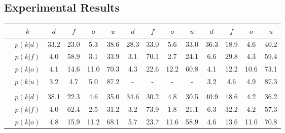 \subsection{Experimental Results}
\label{subsec:exp_results_cam_inputs}
\begin{tabular}{c|c|cccc|cccc|cccc}
	&$k$ & $d$ & $f$ & $o$ & $u$ & $d$ & $f$ & $o$ & $u$ & $d$ & $f$ & $o$ & $u$\\
	\hline
	\parbox[t]{2mm}{}&$p(k|d)$ & \textcolor{mygreen}{33.2} & \textcolor{myred}{23.0} & \textcolor{myred}{5.3} & 38.6 & \textcolor{mygreen}{28.3} & \textcolor{myred}{33.0} & \textcolor{myred}{5.6} & 33.0 & \textcolor{mygreen}{36.3} & \textcolor{myred}{18.9} & \textcolor{myred}{4.6} & 40.2\\
	&$p(k|f)$ & \textcolor{myred}{4.0} & \textcolor{mygreen}{58.9} & \textcolor{myred}{3.1} & 33.9 & \textcolor{myred}{3.1} & \textcolor{mygreen}{70.1} & \textcolor{myred}{2.7} & 24.1 & \textcolor{myred}{6.6} & \textcolor{mygreen}{29.8} & \textcolor{myred}{4.3} & 59.4\\
	&$p(k|o)$ & \textcolor{myred}{4.1} & \textcolor{myred}{14.6} & \textcolor{mygreen}{11.0} & 70.3 & \textcolor{myred}{4.3} & \textcolor{myred}{22.6} & \textcolor{mygreen}{12.2} & 60.8 & \textcolor{myred}{4.1} & \textcolor{myred}{12.2} & \textcolor{mygreen}{10.6} & 73.1\\
	&$p(k|u)$ & 3.2 & 4.7 & 5.0 & 87.2 & - & - & - & - & 3.2 & 4.6 & 4.9 & 87.3\\
	\hline
	\\	
	\hline
	\parbox[t]{2mm}{}&$p(k|d)$ & \textcolor{mygreen}{38.1} & \textcolor{myred}{22.3} & \textcolor{myred}{4.6} & 35.0 & \textcolor{mygreen}{34.6} & \textcolor{myred}{30.2} & \textcolor{myred}{4.8} & 30.5 & \textcolor{mygreen}{40.9} & \textcolor{myred}{18.6} & \textcolor{myred}{4.2} & 36.2\\
	&$p(k|f)$ & \textcolor{myred}{4.0} & \textcolor{mygreen}{62.4} & \textcolor{myred}{2.5} & 31.2 & \textcolor{myred}{3.2} & \textcolor{mygreen}{73.9} & \textcolor{myred}{1.8} & 21.1 & \textcolor{myred}{6.3} & \textcolor{mygreen}{32.2} & \textcolor{myred}{4.2} & 57.3\\
	&$p(k|o)$ & \textcolor{myred}{4.8} & \textcolor{myred}{15.9} & \textcolor{mygreen}{11.2} & 68.1 & \textcolor{myred}{5.7} & \textcolor{myred}{23.7} & \textcolor{mygreen}{11.6} & 58.9 & \textcolor{myred}{4.6} & \textcolor{myred}{13.6} & \textcolor{mygreen}{11.0} & 70.8\\

\end{tabular}
